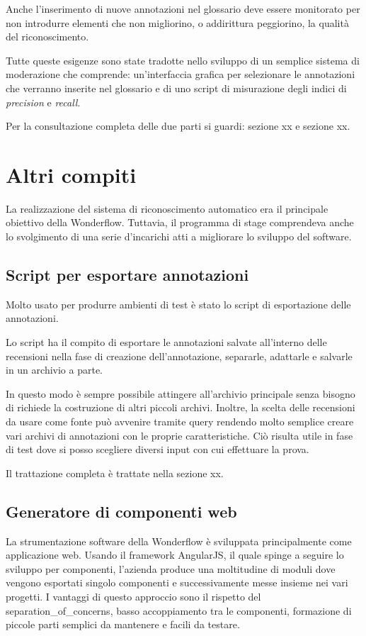 Anche l'inserimento di nuove annotazioni nel glossario deve essere monitorato
per non introdurre elementi che non migliorino, o addirittura peggiorino, la
qualità del riconoscimento.

Tutte queste esigenze sono state tradotte nello sviluppo di un semplice sistema
di moderazione che comprende: un'interfaccia grafica per selezionare le
annotazioni che verranno inserite nel glossario e di uno \gls{script} di
misurazione degli indici di \textit{precision} e \textit{recall}.

Per la consultazione completa delle due parti si guardi: sezione xx e sezione
xx.

\section{Altri compiti}
La realizzazione del sistema di riconoscimento automatico era il principale
obiettivo della Wonderflow. Tuttavia, il programma di stage comprendeva anche lo
svolgimento di una serie d'incarichi atti a migliorare lo sviluppo del software.

\subsection{Script per esportare annotazioni}
Molto usato per produrre ambienti di test è stato lo \gls{script} di
esportazione delle annotazioni.

Lo \gls{script} ha il compito di esportare le annotazioni salvate all'interno
delle recensioni nella fase di creazione dell'annotazione, separarle, adattarle
e salvarle in un archivio a parte.

In questo modo è sempre possibile attingere all'archivio principale senza
bisogno di richiede la costruzione di altri piccoli archivi. Inoltre, la scelta
delle recensioni da usare come fonte può avvenire tramite query rendendo molto
semplice creare vari archivi di annotazioni con le proprie caratteristiche. Ciò
risulta utile in fase di test dove si posso scegliere diversi input con cui
effettuare la prova.

Il trattazione completa è trattate nella sezione xx.

\subsection{Generatore di componenti web}
La strumentazione software della Wonderflow è sviluppata principalmente come
applicazione web. Usando il framework AngularJS, il quale spinge a seguire lo
sviluppo per componenti, l'azienda produce una moltitudine di moduli dove
vengono esportati singolo componenti e successivamente messe insieme nei vari
progetti. I vantaggi di questo approccio sono il rispetto del
\gls{separation_of_concerns}, basso accoppiamento tra le componenti,
formazione di piccole parti semplici da mantenere e facili da testare.

